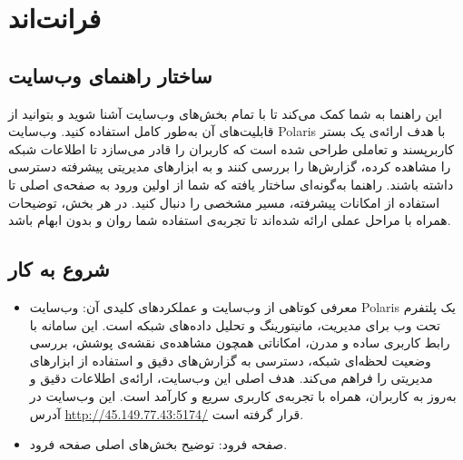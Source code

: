 \chapter{فرانت‌اند}
    \section{ساختار راهنمای وب‌سایت}
    این راهنما به شما کمک می‌کند تا با تمام بخش‌های وب‌سایت آشنا شوید و بتوانید از قابلیت‌های آن به‌طور کامل استفاده کنید. وب‌سایت Polaris با هدف ارائه‌ی یک بستر کاربرپسند و تعاملی طراحی شده است که کاربران را قادر می‌سازد تا اطلاعات شبکه را مشاهده کرده، گزارش‌ها را بررسی کنند و به ابزارهای مدیریتی پیشرفته دسترسی داشته باشند.  
    راهنما به‌گونه‌ای ساختار یافته که شما از اولین ورود به صفحه‌ی اصلی تا استفاده از امکانات پیشرفته، مسیر مشخصی را دنبال کنید. در هر بخش، توضیحات همراه با مراحل عملی ارائه شده‌اند تا تجربه‌ی استفاده شما روان و بدون ابهام باشد.  
    \section{شروع به کار}
    \begin{itemize}
    	\item  معرفی کوتاهی از وب‌سایت و عملکردهای کلیدی آن: وب‌سایت Polaris یک پلتفرم تحت وب برای مدیریت، مانیتورینگ و تحلیل داده‌های شبکه است. این سامانه با رابط کاربری ساده و مدرن، امکاناتی همچون مشاهده‌ی نقشه‌ی پوشش، بررسی وضعیت لحظه‌ای شبکه، دسترسی به گزارش‌های دقیق و استفاده از ابزارهای مدیریتی را فراهم می‌کند. هدف اصلی این وب‌سایت، ارائه‌ی اطلاعات دقیق و به‌روز به کاربران، همراه با تجربه‌ی کاربری سریع و کارآمد است. این وب‌سایت در آدرس \url{http://45.149.77.43:5174/} قرار گرفته است.
    	\item  صفحه فرود: توضیح بخش‌های اصلی صفحه فرود.
    \end{itemize}
